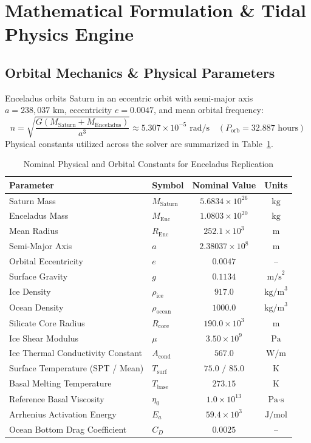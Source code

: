 \documentclass[11pt,a4paper]{article}
\begin{document}
\section{Mathematical Formulation \& Tidal Physics Engine}

\subsection{Orbital Mechanics \& Physical Parameters}
Enceladus orbits Saturn in an eccentric orbit with semi-major axis $a = 238,037\text{ km}$, eccentricity $e = 0.0047$, and mean orbital frequency:
\begin{equation}
n = \sqrt{\frac{G(M_{\text{Saturn}} + M_{\text{Enceladus}})}{a^3}} \approx 5.307 \times 10^{-5}\text{ rad/s} \quad (P_{\text{orb}} = 32.887\text{ hours})
\end{equation}
Physical constants utilized across the solver are summarized in Table~\ref{tab:constants}.

\begin{table}[H]
\centering
\caption{Nominal Physical and Orbital Constants for Enceladus Replication}
\label{tab:constants}
\small
\begin{tabular}{llcc}
\toprule
\textbf{Parameter} & \textbf{Symbol} & \textbf{Nominal Value} & \textbf{Units} \\
\midrule
Saturn Mass & $M_{\text{Saturn}}$ & $5.6834 \times 10^{26}$ & $\text{kg}$ \\
Enceladus Mass & $M_{\text{Enc}}$ & $1.0803 \times 10^{20}$ & $\text{kg}$ \\
Mean Radius & $R_{\text{Enc}}$ & $252.1 \times 10^3$ & $\text{m}$ \\
Semi-Major Axis & $a$ & $2.38037 \times 10^8$ & $\text{m}$ \\
Orbital Eccentricity & $e$ & $0.0047$ & -- \\
Surface Gravity & $g$ & $0.1134$ & $\text{m/s}^2$ \\
Ice Density & $\rho_{\text{ice}}$ & $917.0$ & $\text{kg/m}^3$ \\
Ocean Density & $\rho_{\text{ocean}}$ & $1000.0$ & $\text{kg/m}^3$ \\
Silicate Core Radius & $R_{\text{core}}$ & $190.0 \times 10^3$ & $\text{m}$ \\
Ice Shear Modulus & $\mu$ & $3.50 \times 10^9$ & $\text{Pa}$ \\
Ice Thermal Conductivity Constant & $A_{\text{cond}}$ & $567.0$ & $\text{W/m}$ \\
Surface Temperature (SPT / Mean) & $T_{\text{surf}}$ & $75.0\text{ / }85.0$ & $\text{K}$ \\
Basal Melting Temperature & $T_{\text{base}}$ & $273.15$ & $\text{K}$ \\
Reference Basal Viscosity & $\eta_0$ & $1.0 \times 10^{13}$ & $\text{Pa}\cdot\text{s}$ \\
Arrhenius Activation Energy & $E_a$ & $59.4 \times 10^3$ & $\text{J/mol}$ \\
Ocean Bottom Drag Coefficient & $C_D$ & $0.0025$ & -- \\
\bottomrule
\end{tabular}
\end{table}
\end{document}

